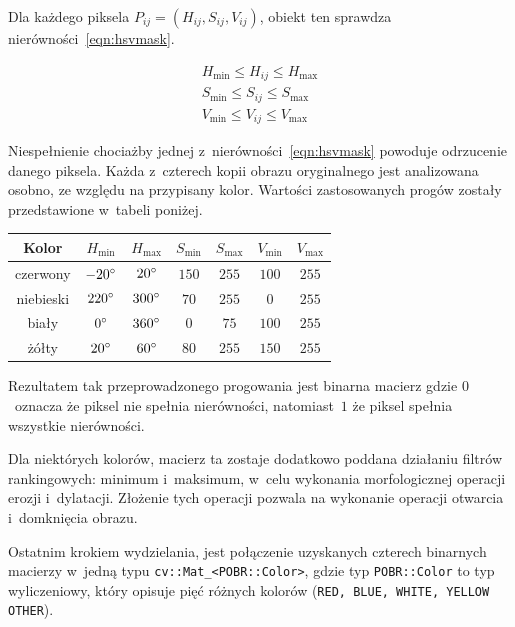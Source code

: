 Dla każdego piksela $P_{ij} = (H_{ij}, S_{ij}, V_{ij})$, obiekt ten sprawdza  nierówności~\ref{eqn:hsvmask}.

\begin{equation}
    \begin{aligned}
        H_{\mathrm{min}} \leq H_{ij} \leq H_{\mathrm{max}} \\
        S_{\mathrm{min}} \leq S_{ij} \leq S_{\mathrm{max}} \\
        V_{\mathrm{min}} \leq V_{ij} \leq V_{\mathrm{max}}
    \end{aligned}
    \label{eqn:hsvmask}
\end{equation}

Niespełnienie chociażby jednej z~nierówności~\ref{eqn:hsvmask} powoduje odrzucenie danego piksela. Każda z~czterech kopii obrazu oryginalnego jest analizowana osobno, ze względu na przypisany kolor. Wartości zastosowanych progów zostały przedstawione w~tabeli poniżej.

\begin{center}
\begin{tabular}{c|c|c|c|c|c|c}
    Kolor & $H_{\mathrm{min}}$ & $H_{\mathrm{max}}$ & $S_{\mathrm{min}}$ & $S_{\mathrm{max}}$ & $V_{\mathrm{min}}$ & $V_{\mathrm{max}}$ \\ \hline 
    czerwony & $-20\degree$ & $20\degree$ & $150$ & $255$ & $100$ & $255$ \\ \hline
    niebieski & $ 220\degree$ & $300\degree$ & $70$ & $255$ & $0$ & $255$ \\ \hline
    biały & $0\degree$ & $360\degree$ & $0$ & $75$ & $100$ & $255$ \\ \hline
    żółty & $20\degree$ & $60\degree$ & $80$ & $255$ & $150$ & $255$ 
\end{tabular}
\end{center}

Rezultatem tak przeprowadzonego progowania jest binarna macierz gdzie $0$~oznacza że piksel nie spełnia nierówności, natomiast~$1$ że piksel spełnia wszystkie nierówności. 

Dla niektórych kolorów, macierz ta zostaje dodatkowo poddana działaniu filtrów rankingowych: minimum i~maksimum, w~celu wykonania morfologicznej operacji erozji i~dylatacji. Złożenie tych operacji pozwala na wykonanie operacji otwarcia i~domknięcia obrazu. 

Ostatnim krokiem wydzielania, jest połączenie uzyskanych czterech binarnych macierzy w~jedną typu \texttt{cv::Mat\_{}<POBR::Color>}, gdzie typ \texttt{POBR::Color} to typ wyliczeniowy, który opisuje pięć różnych kolorów (\texttt{RED, BLUE, WHITE, YELLOW OTHER}). 

